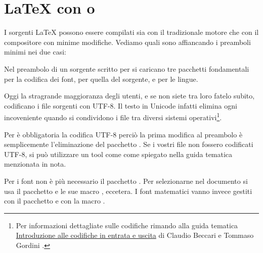 \section{\LaTeX{} con  o }

I sorgenti \LaTeX{} possono essere compilati sia con il tradizionale motore
 che con il compositore  con minime modifiche.
Vediamo quali sono affiancando i preamboli minimi nei due casi:\\
\begin{tcolorbox}[width=(\linewidth/2-1mm),equal height group=A,nobeforeafter]
\end{tcolorbox}
%
\begin{tcolorbox}[width=(\linewidth/2-1mm),equal height group=A,nobeforeafter]
\end{tcolorbox}

Nel preambolo di un sorgente scritto per  si caricano tre
pacchetti fondamentali  per la codifica dei font, 
per quella del sorgente, e  per le lingue.

Oggi la stragrande maggioranza degli utenti, e se non siete tra loro fatelo
subito, codificano i file sorgenti con UTF-8. Il testo in Unicode infatti
elimina ogni incoveniente quando si condividono i file tra diversi sistemi
operativi\footnote{Per informazioni dettagliate sulle codifiche rimando alla
guida tematica \GuIT{}
\href{http://www.guitex.org/home/images/doc/GuideGuIT/introcodifiche.pdf}{%
Introduzione alle codifiche in entrata e uscita} di Claudio Beccari e Tommaso
Gordini \cite{gt:codifiche}.}.

Per \LuaTeX{} è obbligatoria la codifica UTF-8 perciò la prima modifica al
preambolo è semplicemente l'eliminazione del pacchetto . Se i
vostri file non fossero codificati UTF-8, si può utilizzare un tool come
 come spiegato nella guida tematica menzionata in nota.

Per i font non è più necessario il pacchetto . Per selezionarne
nel documento si usa il pacchetto  e le sue macro
,  eccetera. I font matematici vanno invece
gestiti con il pacchetto  e con la macro .

